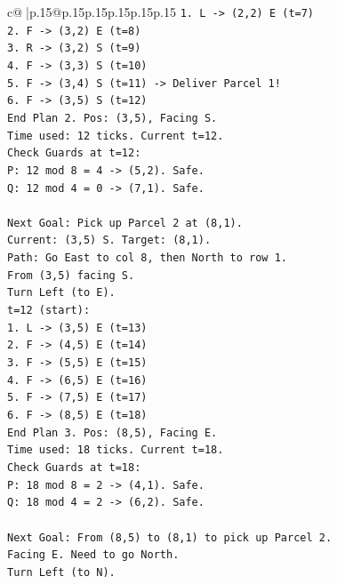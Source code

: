 \documentclass{article}
\begin{document}
{\begin{supertabular}{c@{$\;$}|p{.15\linewidth}@{}p{.15\linewidth}p{.15\linewidth}p{.15\linewidth}p{.15\linewidth}p{.15\linewidth}}
{{{\texttt{1. L {-}> (2,2) E (t=7)} \\
\texttt{2. F {-}> (3,2) E (t=8)} \\
\texttt{3. R {-}> (3,2) S (t=9)} \\
\texttt{4. F {-}> (3,3) S (t=10)} \\
\texttt{5. F {-}> (3,4) S (t=11) {-}> Deliver Parcel 1!} \\
\texttt{6. F {-}> (3,5) S (t=12)} \\
\texttt{End Plan 2. Pos: (3,5), Facing S.} \\
\texttt{Time used: 12 ticks. Current t=12.} \\
\texttt{Check Guards at t=12:} \\
\texttt{P: 12 mod 8 = 4 {-}> (5,2). Safe.} \\
\texttt{Q: 12 mod 4 = 0 {-}> (7,1). Safe.} \\
\\ 
\texttt{Next Goal: Pick up Parcel 2 at (8,1).} \\
\texttt{Current: (3,5) S. Target: (8,1).} \\
\texttt{Path: Go East to col 8, then North to row 1.} \\
\texttt{From (3,5) facing S.} \\
\texttt{Turn Left (to E).} \\
\texttt{t=12 (start):} \\
\texttt{1. L {-}> (3,5) E (t=13)} \\
\texttt{2. F {-}> (4,5) E (t=14)} \\
\texttt{3. F {-}> (5,5) E (t=15)} \\
\texttt{4. F {-}> (6,5) E (t=16)} \\
\texttt{5. F {-}> (7,5) E (t=17)} \\
\texttt{6. F {-}> (8,5) E (t=18)} \\
\texttt{End Plan 3. Pos: (8,5), Facing E.} \\
\texttt{Time used: 18 ticks. Current t=18.} \\
\texttt{Check Guards at t=18:} \\
\texttt{P: 18 mod 8 = 2 {-}> (4,1). Safe.} \\
\texttt{Q: 18 mod 4 = 2 {-}> (6,2). Safe.} \\
\\ 
\texttt{Next Goal: From (8,5) to (8,1) to pick up Parcel 2.} \\
\texttt{Facing E. Need to go North.} \\
\texttt{Turn Left (to N).} \\
}}}
\end{supertabular}}
\end{document}
